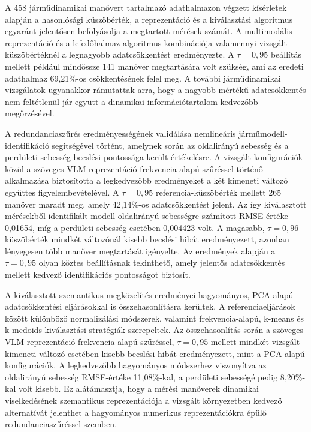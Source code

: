 \documentclass[12pt,a4paper,onehalfspacing, oneside]{book} %
\begin{document}
A 458 járműdinamikai manővert tartalmazó adathalmazon végzett kísérletek alapján a hasonlósági küszöbérték, a reprezentáció és a kiválasztási algoritmus egyaránt jelentősen befolyásolja a megtartott mérések számát. A multimodális reprezentáció és a lefedőhalmaz-algoritmus kombinációja valamennyi vizsgált küszöbértéknél a legnagyobb adatcsökkentést eredményezte. A $\tau=0{,}95$ beállítás mellett például mindössze 141 manőver megtartására volt szükség, ami az eredeti adathalmaz 69,21\%-os csökkentésének felel meg. A további járműdinamikai vizsgálatok ugyanakkor rámutattak arra, hogy a nagyobb mértékű adatcsökkentés nem feltétlenül jár együtt a dinamikai információtartalom kedvezőbb megőrzésével.

A redundanciaszűrés eredményességének validálása nemlineáris járműmodell-identifikáció segítségével történt, amelynek során az oldalirányú sebesség és a perdületi sebesség becslési pontossága került értékelésre. A vizsgált konfigurációk közül a szöveges VLM-reprezentáció frekvencia-alapú szűréssel történő alkalmazása biztosította a legkedvezőbb eredményeket a két kimeneti változó együttes figyelembevételével. A $\tau=0{,}95$ referencia-küszöbérték mellett 265 manőver maradt meg, amely 42,14\%-os adatcsökkentést jelent. Az így kiválasztott mérésekből identifikált modell oldalirányú sebességre számított RMSE-értéke 0,01654, míg a perdületi sebesség esetében 0,004423 volt. A magasabb, $\tau=0{,}96$ küszöbérték mindkét változónál kisebb becslési hibát eredményezett, azonban lényegesen több manőver megtartását igényelte. Az eredmények alapján a $\tau=0{,}95$ olyan köztes beállításnak tekinthető, amely jelentős adatcsökkentés mellett kedvező identifikációs pontosságot biztosít.

A kiválasztott szemantikus megközelítés eredményei hagyományos, PCA-alapú adatcsökkentési eljárásokkal is összehasonlításra kerültek. A referenciaeljárások között különböző normalizálási módszerek, valamint frekvencia-alapú, k-means és k-medoids kiválasztási stratégiák szerepeltek. Az összehasonlítás során a szöveges VLM-reprezentáció frekvencia-alapú szűréssel, $\tau=0{,}95$ mellett mindkét vizsgált kimeneti változó esetében kisebb becslési hibát eredményezett, mint a PCA-alapú konfigurációk. A legkedvezőbb hagyományos módszerhez viszonyítva az oldalirányú sebesség RMSE-értéke 11,08\%-kal, a perdületi sebességé pedig 8,20\%-kal volt kisebb. Ez alátámasztja, hogy a mérési manőverek dinamikai viselkedésének szemantikus reprezentációja a vizsgált környezetben kedvező alternatívát jelenthet a hagyományos numerikus reprezentációkra épülő redundanciaszűréssel szemben.
\end{document}
